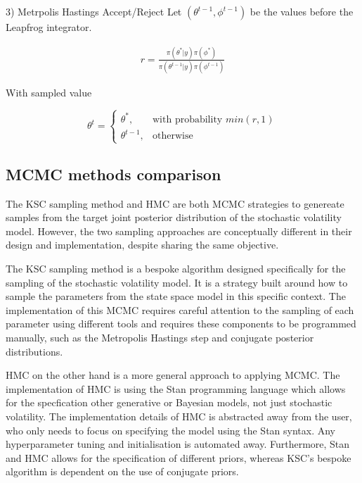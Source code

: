 \documentclass[12pt, a4paper]{article}
\begin{document}
        3) Metrpolis Hastings Accept/Reject
        Let $(\theta^{t-1}, \phi^{t-1})$ be the values before the Leapfrog integrator.

        $$
        \begin{aligned}
        r = \frac{\pi(\theta^{\ast} | y) \pi(\phi^{\ast})}{\pi(\theta^{t-1} | y) \pi(\phi^{t-1})}
        \end{aligned}
        $$

        With sampled value

        $$
        \theta^t = \begin{cases}
            \theta^{\ast},& \text{with probability } min(r,1)\\
            \theta^{t-1}, & \text{otherwise}
        \end{cases}
        $$

    \subsection{MCMC methods comparison}
        The KSC sampling method and HMC are both MCMC strategies to genereate samples from the target joint posterior distribution of the stochastic volatility model. However, the two sampling approaches are conceptually different in their design and implementation, despite sharing the same objective.
        
        The KSC sampling method is a bespoke algorithm designed specifically for the sampling of the stochastic volatility model. It is a strategy built around how to sample the parameters from the state space model in this specific context. The implementation of this MCMC requires careful attention to the sampling of each parameter using different tools and requires these components to be programmed manually, such as the Metropolis Hastings step and conjugate posterior distributions. 
    
        HMC on the other hand is a more general approach to applying MCMC. The implementation of HMC is using the Stan programming language which allows for the specfication other generative or Bayesian models, not just stochastic volatility. The implementation details of HMC is abstracted away from the user, who only needs to focus on specifying the model using the Stan syntax. Any hyperparameter tuning and initialisation is automated away. Furthermore, Stan and HMC allows for the specification of different priors, whereas KSC's bespoke algorithm is dependent on the use of conjugate priors. 
\end{document}
